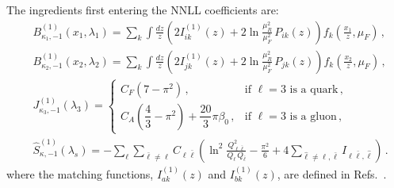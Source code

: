 The ingredients first entering the NNLL coefficients are:
\begin{subequations}
\label{eq:Cd1-ingred}
\begin{align}
&B_{\kappa_{1},-1}^{(1)}(x_1,\lambda_1) = \sum_{k}\int\frac{dz}{z} \left( 2I_{ik}^{(1)}(z)+2\ln\frac{\mu_R^2}{\mu_F^2}\,P_{ik}(z)\right)f_k\left(\frac{x_1}{z},\mu_F\right)\,, \\[1ex]
&B_{\kappa_{2},-1}^{(1)}(x_2,\lambda_2) = \sum_{k}\int\frac{dz}{z} \left( 2I_{jk}^{(1)}(z)+2\ln\frac{\mu_R^2}{\mu_F^2}\,P_{jk}(z)\right)f_k\left(\frac{x_2}{z},\mu_F\right)\,, \\[1ex]
&J_{\kappa_3,-1}^{(1)}(\lambda_3) = \begin{cases}
    C_F(7-\pi^2)\,, & \text{if $\ell=3$ is a quark}\,, \\[4pt]
    C_A\!\left(\dfrac{4}{3}-\pi^2\right)+\dfrac{20}{3}\pi\beta_0\,, &\text{if $\ell=3$ is a gluon}\,,
\end{cases} \\[1ex]
&\widehat{S}_{\kappa,-1}^{(1)}\left(\lambda_s\right)
  = -\sum_{\ell}\sum_{\bar{\ell}\neq\ell}C_{\ell\bar\ell}\left(\ln^2\frac{Q_{\ell\bar{\ell}}^2}{Q_{\ell}\,Q_{\bar{\ell}}}-\frac{\pi^2}{6}+4\sum_{\hat{\ell}\neq\ell,\bar{\ell}}I_{\ell\bar{\ell},\hat{\ell}}\right)\,.
\end{align}
\end{subequations}
where the matching functions, $I_{ak}^{(1)}(z)$ and $I_{bk}^{(1)}(z)$, 
are defined in Refs.~\cite{Gaunt:2014xga,Gaunt:2014cfa}.

